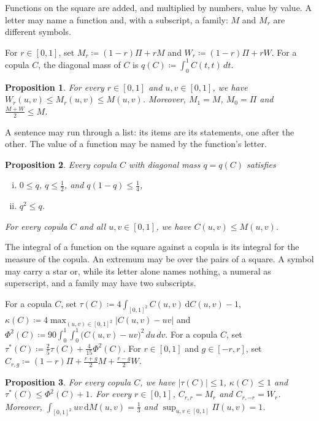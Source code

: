 \documentclass{article}
\newtheorem{proposition}{Proposition}
\begin{document}
Functions on the square are added, and multiplied by numbers, value by value. A letter
may name a function and, with a subscript, a family: $M$ and $M_r$ are different symbols.

For $r\in[0,1]$, set $M_r\coloneqq(1-r)\Pi+rM$ and $W_r\coloneqq(1-r)\Pi+rW$.
For a copula $C$, the diagonal mass of $C$ is $q(C)\coloneqq\int_0^1 C(t,t)\,dt$.

\begin{proposition}\label{p12}
For every $r\in[0,1]$ and $u,v\in[0,1]$, we have $W_r(u,v)\le M_r(u,v)\le M(u,v)$.
Moreover, $M_1=M$, $M_0=\Pi$ and $\frac{M+W}2\le M$.
\end{proposition}

A sentence may run through a list: its items are its statements, one after the other.
The value of a function may be named by the function's letter.

\begin{proposition}\label{p13}
Every copula $C$ with diagonal mass $q=q(C)$ satisfies
\begin{enumerate}[(i)]
\item $0\le q$, $q\le\frac12$, and $q(1-q)\le\frac14$,
\item $q^2\le q$.
\end{enumerate}
For every copula $C$ and all $u,v\in[0,1]$, we have $C(u,v)\le M(u,v)$.
\end{proposition}

The integral of a function on the square against a copula is its integral for the measure
of the copula. An extremum may be over the pairs of a square. A symbol may carry a star
or, while its letter alone names nothing, a numeral as superscript, and a family may have
two subscripts.

For a copula $C$, set $\tau(C)\coloneqq4\int_{[0,1]^2}C(u,v)\,\mathrm{d}C(u,v)-1$, $\kappa(C)\coloneqq4\max_{(u,v)\in[0,1]^2}|C(u,v)-uv|$ and $\Phi^2(C)\coloneqq90\int_0^1\int_0^1\bigl(C(u,v)-uv\bigr)^2\,du\,dv$.
For a copula $C$, set $\tau^*(C)\coloneqq\frac25\tau(C)+\frac4{15}\Phi^2(C)$.
For $r\in[0,1]$ and $g\in[-r,r]$, set $C_{r,g}\coloneqq(1-r)\Pi+\frac{r+g}2M+\frac{r-g}2W$.

\begin{proposition}\label{p14}
For every copula $C$, we have $|\tau(C)|\le1$, $\kappa(C)\le1$ and $\tau^*(C)\le\Phi^2(C)+1$.
For every $r\in[0,1]$, $C_{r,r}=M_r$ and $C_{r,-r}=W_r$.
Moreover, $\int_{[0,1]^2}uv\,\mathrm{d}M(u,v)=\frac13$ and $\sup_{u,v\in[0,1]}\Pi(u,v)=1$.
\end{proposition}
\end{document}
